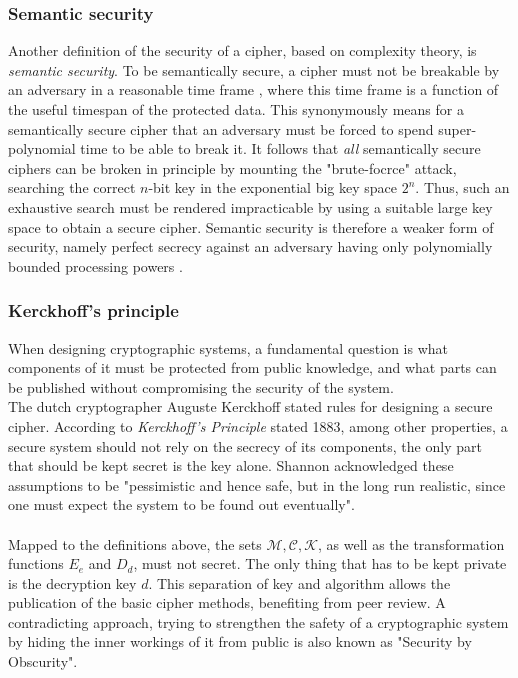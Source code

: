 \subsubsection{Semantic security}

Another definition of the security of a cipher, based on complexity theory, is \textit{semantic security}.
To be semantically secure, a cipher must not be breakable by an adversary in a reasonable time
frame \cite{handbook1}, where this time frame is a function of the useful timespan of the protected data. This synonymously means for a semantically secure
cipher that an adversary must be forced to spend super-polynomial time to be able to break it. It follows that \textit{all} semantically secure ciphers
can be broken in principle by mounting the "brute-focrce" attack, searching the correct $n$-bit key in the exponential big key space $2^n$. Thus, such an
exhaustive search must be rendered impracticable by using a suitable large key space to obtain a secure cipher.
Semantic security is therefore a weaker form of security, namely perfect secrecy against an adversary having only polynomially bounded
processing powers \cite{GoldwasserMicali}.

\subsubsection{Kerckhoff's principle}
When designing cryptographic systems, a fundamental question is what components of it must be protected from public knowledge, and what parts can be
published without compromising the security of the system. 
\\
The dutch cryptographer Auguste Kerckhoff stated rules for designing a secure cipher.
According to \textit{Kerckhoff's Principle} stated 1883, among other properties, a secure system should not rely on the secrecy of
its components, the only part that should be kept secret is the key alone. Shannon acknowledged these assumptions to be "pessimistic and hence safe, but 
in the long run realistic, since one must expect the system to be found out eventually".
\\
\\
Mapped to the definitions above, the sets $\mathcal{M, C, K}$, as well as the
transformation functions $E_e$ and $D_d$, must not secret. The only thing that has to be kept private is the decryption key $d$.
This separation of key and algorithm allows the publication of the basic cipher methods, benefiting from peer review. A contradicting approach, 
trying to strengthen the safety of a cryptographic system by hiding the inner workings of it from public is also known as "Security by Obscurity".

